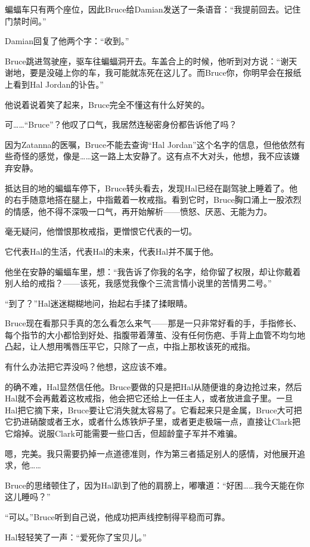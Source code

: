 \documentclass[../main.tex]{subfiles}
\begin{document}
蝙蝠车只有两个座位，因此Bruce给Damian发送了一条语音：“我提前回去。记住门禁时间。”

Damian回复了他两个字：“收到。”

Bruce跳进驾驶座，驱车往蝙蝠洞开去。车盖合上的时候，他听到对方说：“谢天谢地，要是没碰上你的车，我可能就冻死在这儿了。而Bruce你，你明早会在报纸上看到Hal
Jordan的讣告。”

他说着说着笑了起来，Bruce完全不懂这有什么好笑的。

可\ldots\ldots“Bruce”？他叹了口气，我居然连秘密身份都告诉他了吗？

因为Zatanna的医嘱，Bruce不能去查询“Hal
Jordan”这个名字的信息，但他依然有些奇怪的感觉，像是\ldots\ldots 这一路上太安静了。这有点不大对头，他想，我不应该嫌弃安静。

抵达目的地的蝙蝠车停下，Bruce转头看去，发现Hal已经在副驾驶上睡着了。他的右手随意地搭在腿上，中指戴着一枚戒指。看到它时，Bruce胸口涌上一股浓烈的情感，他不得不深吸一口气，再开始解析——愤怒、厌恶、无能为力。

毫无疑问，他憎恨那枚戒指，更憎恨它代表的一切。

它代表Hal的生活，代表Hal的未来，代表Hal并不属于他。

他坐在安静的蝙蝠车里，想：“我告诉了你我的名字，给你留了权限，却让你戴着别人给的戒指？——该死，我感觉我像个三流言情小说里的苦情男二号。”

“到了？”Hal迷迷糊糊地问，抬起右手揉了揉眼睛。

Bruce现在看那只手真的怎么看怎么来气——那是一只非常好看的手，手指修长、每个指节的大小都恰到好处、指腹带着薄茧、没有任何伤疤、手背上血管不均匀地凸起，让人想用嘴唇压平它，只除了一点，中指上那枚该死的戒指。

有什么办法把它弄没吗？他想，这应该不难。

的确不难，Hal显然信任他。Bruce要做的只是把Hal从随便谁的身边抢过来，然后Hal就不会再戴着这枚戒指，他会把它还给上一任主人，或者放进盒子里。一旦Hal把它摘下来，Bruce要让它消失就太容易了。它看起来只是金属，Bruce大可把它扔进硝酸或者王水，或者什么炼铁炉子里，或者更走极端一点，直接让Clark把它熔掉。说服Clark可能需要一些口舌，但超龄童子军并不难骗。

嗯，完美。我只需要扔掉一点道德准则，作为第三者插足别人的感情，对他展开追求，他\ldots\ldots{}

Bruce的思绪顿住了，因为Hal趴到了他的肩膀上，嘟囔道：“好困\ldots\ldots 我今天能在你这儿睡吗？”

“可以。”Bruce听到自己说，他成功把声线控制得平稳而可靠。

Hal轻轻笑了一声：“爱死你了宝贝儿。”
\end{document}
